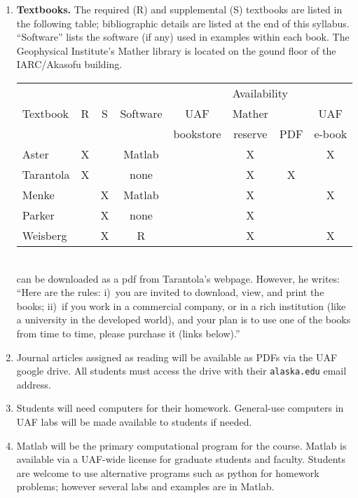 \documentclass[10pt,titlepage,fleqn]{article}
\begin{document}
\begin{enumerate}
\begin{enumerate}
\item {\bf Textbooks.} The required (R) and supplemental (S) textbooks are listed in the following table; bibliographic details are listed at the end of this syllabus. ``Software'' lists the software (if any) used in examples within each book. The Geophysical Institute's Mather library is located on the gound floor of the IARC/Akasofu building.

\begin{tabular}{l|c|c|c|c|c|c|c}
\hline
     &          & &      & \multicolumn{4}{c}{Availability}    \\ \cline{5-8}
Textbook & R & S & Software & UAF       & Mather  &     & UAF     \\
     &          & &          & bookstore & reserve & PDF & e-book  \\ \hline
\cite{AsterE2} Aster           & X & & Matlab & & X & & X \\ \hline
\cite{Tarantola2005} Tarantola & X & & none   & & X & X & \\ \hline
\cite{MenkeE3} Menke           & & X & Matlab & & X & & X \\ \hline
\cite{Parker} Parker           & & X & none   & & X & & \\ \hline
\cite{WeisbergE4} Weisberg     & & X & R      & & X & & X \\ \hline
\end{tabular} \\

\cite{Tarantola2005} can be downloaded as a pdf from Tarantola's webpage. However, he writes: ``Here are the rules: i)~you are invited to download, view, and print the books; ii)~if you work in a commercial company, or in a rich institution (like a university in the developed world), and your plan is to use one of the books from time to time, please purchase it (links below).''

\item Journal articles assigned as reading will be available as PDFs via the UAF google drive. All students must access the drive with their \verb+alaska.edu+ email address.

\item Students will need computers for their homework. General-use computers in UAF labs will be made available to students if needed.

\item Matlab will be the primary computational program for the course.
Matlab is available via a UAF-wide license for graduate students and faculty.
Students are welcome to use alternative programs such as python for homework problems; however several labs and examples are in Matlab.


\end{enumerate}
\end{enumerate}
\end{document}
